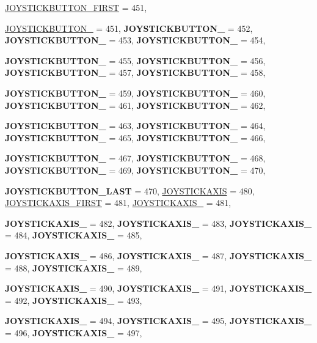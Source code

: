 \begin{DoxyCompactItemize}
\hyperlink{classphys_1_1MetaCode_a3e501cbb5bf0f6f1fdb7211465bda8d8a88e7d7302a93326fdcc2181f96dc878e}{JOYSTICKBUTTON\_\-FIRST} =  451, 
\par
\hyperlink{classphys_1_1MetaCode_a3e501cbb5bf0f6f1fdb7211465bda8d8a86e63516a8beca3310a2cecf77366e8d}{JOYSTICKBUTTON\_} =  451, 
{\bfseries JOYSTICKBUTTON\_} =  452, 
{\bfseries JOYSTICKBUTTON\_} =  453, 
{\bfseries JOYSTICKBUTTON\_} =  454, 
\par
{\bfseries JOYSTICKBUTTON\_} =  455, 
{\bfseries JOYSTICKBUTTON\_} =  456, 
{\bfseries JOYSTICKBUTTON\_} =  457, 
{\bfseries JOYSTICKBUTTON\_} =  458, 
\par
{\bfseries JOYSTICKBUTTON\_} =  459, 
{\bfseries JOYSTICKBUTTON\_} =  460, 
{\bfseries JOYSTICKBUTTON\_} =  461, 
{\bfseries JOYSTICKBUTTON\_} =  462, 
\par
{\bfseries JOYSTICKBUTTON\_} =  463, 
{\bfseries JOYSTICKBUTTON\_} =  464, 
{\bfseries JOYSTICKBUTTON\_} =  465, 
{\bfseries JOYSTICKBUTTON\_} =  466, 
\par
{\bfseries JOYSTICKBUTTON\_} =  467, 
{\bfseries JOYSTICKBUTTON\_} =  468, 
{\bfseries JOYSTICKBUTTON\_} =  469, 
{\bfseries JOYSTICKBUTTON\_} =  470, 
\par
{\bfseries JOYSTICKBUTTON\_\-LAST} =  470, 
\hyperlink{classphys_1_1MetaCode_a3e501cbb5bf0f6f1fdb7211465bda8d8ab4e0e44b1cad95e292e9e436f3e59e0a}{JOYSTICKAXIS} =  480, 
\hyperlink{classphys_1_1MetaCode_a3e501cbb5bf0f6f1fdb7211465bda8d8a25c2eaee4c0cbf93209042779b1e2e99}{JOYSTICKAXIS\_\-FIRST} =  481, 
\hyperlink{classphys_1_1MetaCode_a3e501cbb5bf0f6f1fdb7211465bda8d8afb08cfe0a86642fde2caabfa963efba4}{JOYSTICKAXIS\_} =  481, 
\par
{\bfseries JOYSTICKAXIS\_} =  482, 
{\bfseries JOYSTICKAXIS\_} =  483, 
{\bfseries JOYSTICKAXIS\_} =  484, 
{\bfseries JOYSTICKAXIS\_} =  485, 
\par
{\bfseries JOYSTICKAXIS\_} =  486, 
{\bfseries JOYSTICKAXIS\_} =  487, 
{\bfseries JOYSTICKAXIS\_} =  488, 
{\bfseries JOYSTICKAXIS\_} =  489, 
\par
{\bfseries JOYSTICKAXIS\_} =  490, 
{\bfseries JOYSTICKAXIS\_} =  491, 
{\bfseries JOYSTICKAXIS\_} =  492, 
{\bfseries JOYSTICKAXIS\_} =  493, 
\par
{\bfseries JOYSTICKAXIS\_} =  494, 
{\bfseries JOYSTICKAXIS\_} =  495, 
{\bfseries JOYSTICKAXIS\_} =  496, 
{\bfseries JOYSTICKAXIS\_} =  497, 
\par

\end{DoxyCompactItemize}
